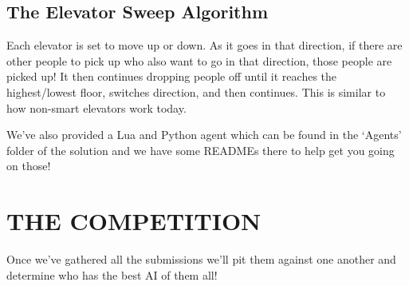 \documentclass{article}
\begin{document}
\subsection*{The Elevator Sweep Algorithm}
Each elevator is set to move up or down. As it goes in that direction, if there are other people to pick up who also want to go in that direction, those people are picked up! It then continues dropping people off until it reaches the highest/lowest floor, switches direction, and then continues. This is similar to how non-smart elevators work today.

We've also provided a Lua and Python agent which can be found in the `Agents' folder of the solution and we have some READMEs there to help get you going on those!

\section*{THE COMPETITION}
Once we've gathered all the submissions we'll pit them against one another and determine who has the best AI of them all!
\end{document}
